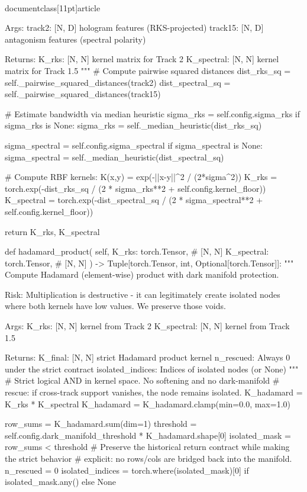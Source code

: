 \\documentclass[11pt]{article}
\begin{document}
\begin{CodeBlock}
        Args:
            track2: [N, D] hologram features (RKS-projected)
            track15: [N, D] antagonism features (spectral polarity)

        Returns:
            K_rks: [N, N] kernel matrix for Track 2
            K_spectral: [N, N] kernel matrix for Track 1.5
        """
        # Compute pairwise squared distances
        dist_rks_sq = self._pairwise_squared_distances(track2)
        dist_spectral_sq = self._pairwise_squared_distances(track15)

        # Estimate bandwidth via median heuristic
        sigma_rks = self.config.sigma_rks
        if sigma_rks is None:
            sigma_rks = self._median_heuristic(dist_rks_sq)

        sigma_spectral = self.config.sigma_spectral
        if sigma_spectral is None:
            sigma_spectral = self._median_heuristic(dist_spectral_sq)

        # Compute RBF kernels: K(x,y) = exp(-||x-y||^2 / (2*sigma^2))
        K_rks = torch.exp(-dist_rks_sq / (2 * sigma_rks**2 + self.config.kernel_floor))
        K_spectral = torch.exp(-dist_spectral_sq / (2 * sigma_spectral**2 + self.config.kernel_floor))

        return K_rks, K_spectral

    def hadamard_product(
        self,
        K_rks: torch.Tensor,      # [N, N]
        K_spectral: torch.Tensor, # [N, N]
    ) -> Tuple[torch.Tensor, int, Optional[torch.Tensor]]:
        """
        Compute Hadamard (element-wise) product with dark manifold protection.

        Risk: Multiplication is destructive - it can legitimately create isolated
        nodes where both kernels have low values. We preserve those voids.

        Args:
            K_rks: [N, N] kernel from Track 2
            K_spectral: [N, N] kernel from Track 1.5

        Returns:
            K_final: [N, N] strict Hadamard product kernel
            n_rescued: Always 0 under the strict contract
            isolated_indices: Indices of isolated nodes (or None)
        """
        # Strict logical AND in kernel space. No softening and no dark-manifold
        # rescue: if cross-track support vanishes, the node remains isolated.
        K_hadamard = K_rks * K_spectral
        K_hadamard = K_hadamard.clamp(min=0.0, max=1.0)

        row_sums = K_hadamard.sum(dim=1)
        threshold = self.config.dark_manifold_threshold * K_hadamard.shape[0]
        isolated_mask = row_sums < threshold
        # Preserve the historical return contract while making the strict behavior
        # explicit: no rows/cols are bridged back into the manifold.
        n_rescued = 0
        isolated_indices = torch.where(isolated_mask)[0] if isolated_mask.any() else None


\end{CodeBlock}
\end{document}
